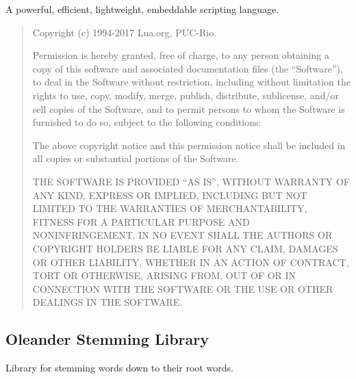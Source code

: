 \documentclass[
]{book}
\theoremstyle{definition}
\theoremstyle{definition}
\theoremstyle{definition}
\theoremstyle{definition}
\theoremstyle{remark}
\begin{document}
A powerful, efficient, lightweight, embeddable scripting language.

\begin{quote}
Copyright (c) 1994-2017 Lua.org, PUC-Rio.

Permission is hereby granted, free of charge, to any person obtaining
a copy of this software and associated documentation files (the ``Software''),
to deal in the Software without restriction, including without limitation
the rights to use, copy, modify, merge, publish, distribute, sublicense,
and/or sell copies of the Software, and to permit persons to whom the
Software is furnished to do so, subject to the following conditions:

The above copyright notice and this permission notice shall be included
in all copies or substantial portions of the Software.

THE SOFTWARE IS PROVIDED ``AS IS'', WITHOUT WARRANTY OF ANY KIND, EXPRESS
OR IMPLIED, INCLUDING BUT NOT LIMITED TO THE WARRANTIES OF MERCHANTABILITY,
FITNESS FOR A PARTICULAR PURPOSE AND NONINFRINGEMENT. IN NO EVENT SHALL
THE AUTHORS OR COPYRIGHT HOLDERS BE LIABLE FOR ANY CLAIM, DAMAGES OR
OTHER LIABILITY, WHETHER IN AN ACTION OF CONTRACT, TORT OR OTHERWISE,
ARISING FROM, OUT OF OR IN CONNECTION WITH THE SOFTWARE OR THE USE OR
OTHER DEALINGS IN THE SOFTWARE.
\end{quote}

\hypertarget{oleander-stemming-library}{%
\subsection*{Oleander Stemming Library}\label{oleander-stemming-library}}

Library for stemming words down to their root words.
\end{document}
